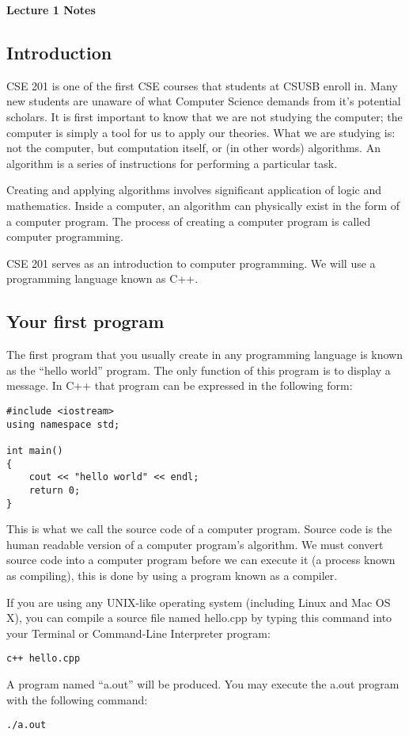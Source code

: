 \documentclass[a4paper,12pt]{article}
\begin{document}
\lstset{frame=single,tabsize=4,basicstyle=\ttfamily}

{\centering \bf \Large
Lecture 1 Notes \\[\baselineskip]
}

\subsection*{Introduction}

CSE 201 is one of the first CSE courses that students at CSUSB enroll in. Many new students are unaware of what Computer Science demands from it's potential scholars. It is first important to know that we are not studying the computer; the computer is simply a tool for us to apply our theories. What we are studying is: not the computer, but computation itself, or (in other words) algorithms. An algorithm is a series of instructions for performing a particular task. 

Creating and applying algorithms involves significant application of logic and mathematics. Inside a computer, an algorithm can physically exist in the form of a computer program. The process of creating a computer program is called computer programming.

CSE 201 serves as an introduction to computer programming. We will use a programming language known as C++.

\subsection*{Your first program}

The first program that you usually create in any programming language is known as the ``hello world'' program. The only function of this program is to display a message. In C++ that program can be expressed in the following form:

\begin{lstlisting}[caption=hello.cpp]
#include <iostream>
using namespace std;

int main()
{
	cout << "hello world" << endl;
	return 0;
}
\end{lstlisting}

This is what we call the source code of a computer program. Source code is the human readable version of a computer program's algorithm. We must convert source code into a computer program before we can execute it (a process known as compiling), this is done by using a program known as a compiler. 

If you are using any UNIX-like operating system (including Linux and Mac OS X), you can compile a source file named hello.cpp by typing this command into your Terminal or Command-Line Interpreter program:
\begin{lstlisting}
c++ hello.cpp
\end{lstlisting}
A program named ``a.out'' will be produced.  You may execute the a.out program with the following command:
\begin{lstlisting}
./a.out
\end{lstlisting}
\end{document}
